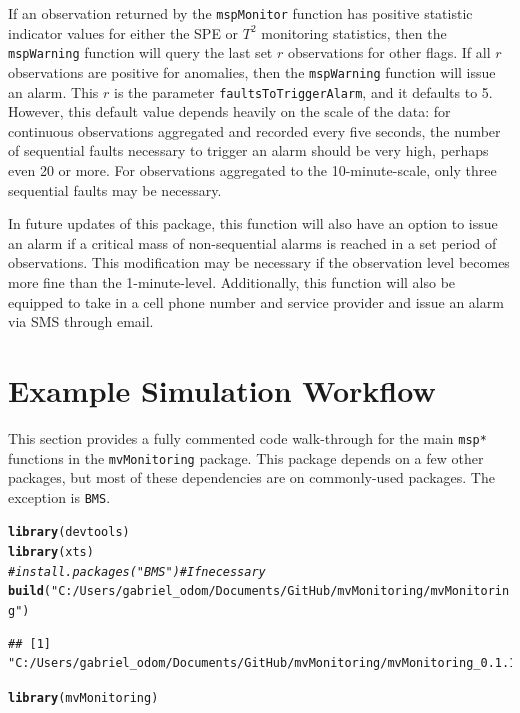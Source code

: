 \documentclass{report}\usepackage[]{graphicx}\usepackage[]{color}
\makeatletter
\newcommand{\hlstr}[1]{\textcolor[rgb]{0.192,0.494,0.8}{#1}}%
\newcommand{\hlcom}[1]{\textcolor[rgb]{0.678,0.584,0.686}{\textit{#1}}}%
\newcommand{\hlstd}[1]{\textcolor[rgb]{0.345,0.345,0.345}{#1}}%
\newcommand{\hlkwd}[1]{\textcolor[rgb]{0.737,0.353,0.396}{\textbf{#1}}}%
\newenvironment{kframe}{%
 \def\at@end@of@kframe{}%
 \ifinner\ifhmode%
  \def\at@end@of@kframe{\end{minipage}}%
  \begin{minipage}{\columnwidth}%
 \fi\fi%
 \def\FrameCommand##1{\hskip\@totalleftmargin \hskip-\fboxsep
 \colorbox{shadecolor}{##1}\hskip-\fboxsep
     \hskip-\linewidth \hskip-\@totalleftmargin \hskip\columnwidth}%
 \MakeFramed {\advance\hsize-\width
   \@totalleftmargin\z@ \linewidth\hsize
   \@setminipage}}%
 {\par\unskip\endMakeFramed%
 \at@end@of@kframe}
\newenvironment{knitrout}{}{} %
\makeatother
\begin{document}
If an observation returned by the \texttt{mspMonitor} function has positive statistic indicator values for either the SPE or $T^2$ monitoring statistics, then the \texttt{mspWarning} function will query the last set $r$ observations for other flags. If all $r$ observations are positive for anomalies, then the \texttt{mspWarning} function will issue an alarm. This $r$ is the parameter \texttt{faultsToTriggerAlarm}, and it defaults to 5. However, this default value depends heavily on the scale of the data: for continuous observations aggregated and recorded every five seconds, the number of sequential faults necessary to trigger an alarm should be very high, perhaps even 20 or more. For observations aggregated to the 10-minute-scale, only three sequential faults may be necessary.

In future updates of this package, this function will also have an option to issue an alarm if a critical mass of non-sequential alarms is reached in a set period of observations. This modification may be necessary if the observation level becomes more fine than the 1-minute-level. Additionally, this function will also be equipped to take in a cell phone number and service provider and issue an alarm via SMS through email.




\section{Example Simulation Workflow} \label{sec:D_Workflow}

This section provides a fully commented code walk-through for the main \texttt{msp*} functions in the \texttt{mvMonitoring} package. This package depends on a few other packages, but most of these dependencies are on commonly-used packages. The exception is \texttt{BMS}.
\begin{knitrout}
\color{fgcolor}\begin{kframe}
\begin{alltt}
\hlkwd{library}\hlstd{(devtools)}
\hlkwd{library}\hlstd{(xts)}
\hlcom{# install.packages("BMS") # If necessary}
\hlkwd{build}\hlstd{(}\hlstr{"C:/Users/gabriel_odom/Documents/GitHub/mvMonitoring/mvMonitoring"}\hlstd{)}
\end{alltt}
\begin{verbatim}
## [1] "C:/Users/gabriel_odom/Documents/GitHub/mvMonitoring/mvMonitoring_0.1.1.tar.gz"
\end{verbatim}
\begin{alltt}
\hlkwd{library}\hlstd{(mvMonitoring)}
\end{alltt}
\end{kframe}
\end{knitrout}
\end{document}
